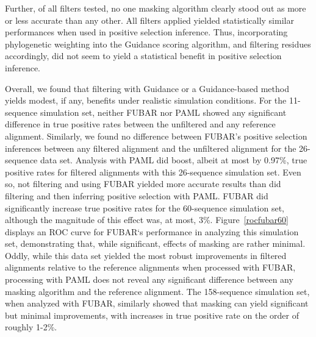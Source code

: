 \documentclass[10pt]{article}
\begin{document}
Further, of all filters tested, no one masking algorithm clearly stood out as more or less accurate than any other. All filters applied yielded statistically similar performances when used in positive selection inference. Thus, incorporating phylogenetic weighting into the Guidance scoring algorithm, and filtering residues accordingly, did not seem to yield a statistical benefit in positive selection inference. 

Overall, we found that filtering with Guidance or a Guidance-based method yields modest, if any, benefits under realistic simulation conditions. 
For the 11-sequence simulation set, neither FUBAR nor PAML showed any significant difference in true positive rates between the unfiltered and any reference alignment. Similarly, we found no difference between FUBAR’s positive selection inferences between any filtered alignment and the unfiltered alignment for the 26-sequence data set. Analysis with PAML did boost, albeit at most by 0.97\%, true positive rates for filtered alignments with this 26-sequence simulation set. Even so, not filtering and using FUBAR yielded more accurate results than did filtering and then inferring positive selection with PAML. 
FUBAR did significantly increase true positive rates for the 60-sequence simulation set, although the magnitude of this effect was, at most, 3\%. Figure~\ref{rocfubar60} displays an ROC curve for FUBAR`s performance in analyzing this simulation set, demonstrating that, while significant, effects of masking are rather minimal. Oddly, while this data set yielded the most robust improvements in filtered alignments relative to the reference alignments when processed with FUBAR, processing with PAML does not reveal any significant difference between any masking algorithm and the reference alignment.
The 158-sequence simulation set, when analyzed with FUBAR, similarly showed that masking can yield significant but minimal improvements, with increases in true positive rate on the order of roughly 1-2\%. 
\end{document}
